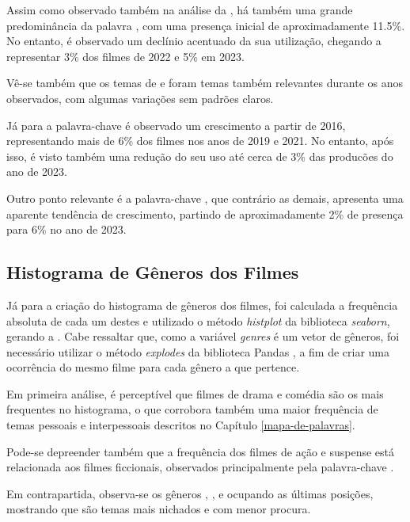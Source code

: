 Assim como observado também na análise da , há também uma grande predominância da palavra , com uma presença inicial de aproximadamente 11.5\%. No entanto, é observado um declínio acentuado da sua utilização, chegando a representar 3\% dos filmes de 2022 e 5\% em 2023.

Vê-se também que os temas de  e  foram temas também relevantes durante os anos observados, com algumas variações sem padrões claros.

Já para a palavra-chave  é observado um crescimento a partir de 2016, representando mais de 6\% dos filmes nos anos de 2019 e 2021. No entanto, após isso, é visto também uma redução do seu uso até cerca de 3\% das producões do ano de 2023.

Outro ponto relevante é a palavra-chave , que contrário as demais, apresenta uma aparente tendência de crescimento, partindo de aproximadamente 2\% de presença para 6\% no ano de 2023.

\subsection{Histograma de Gêneros dos Filmes}\label{movie-genre-hist}
Já para a criação do histograma de gêneros dos filmes, foi calculada a frequência absoluta de cada um destes e utilizado o método \textit{histplot} da biblioteca \textit{seaborn}\cite{seaborn}, gerando a . Cabe ressaltar que, como a variável \textit{genres} é um vetor de gêneros, foi necessário utilizar o método \textit{explodes} da biblioteca Pandas \cite{pandas}, a fim de criar uma ocorrência do mesmo filme para cada gênero a que pertence.

%

Em primeira análise, é perceptível que filmes de drama e comédia são os mais frequentes no histograma, o que corrobora também uma maior frequência de temas pessoais e interpessoais descritos no Capítulo \ref{mapa-de-palavras}.

Pode-se depreender também que a frequência dos filmes de ação e suspense está relacionada aos filmes ficcionais, observados principalmente pela palavra-chave .

Em contrapartida, observa-se os gêneros , ,  e  ocupando as últimas posições, mostrando que são temas mais nichados e com menor procura.

